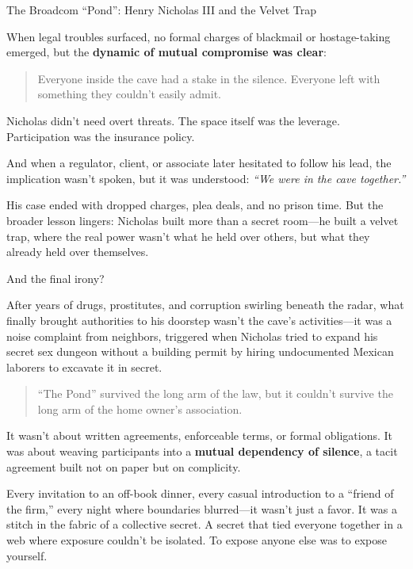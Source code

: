 \begin{HistoricalSidebar}{The Broadcom ``Pond'': Henry Nicholas III and the Velvet Trap}
  \medskip
  
  When legal troubles surfaced, no formal charges of blackmail or hostage-taking emerged, but the \textbf{dynamic of mutual compromise was clear}:  

  \begin{quote}
  Everyone inside the cave had a stake in the silence.  Everyone left with something they couldn’t easily admit.  
  \end{quote}
  
  Nicholas didn’t need overt threats. The space itself was the leverage. Participation was the insurance policy.  

  \medskip
  
  And when a regulator, client, or associate later hesitated to follow his lead, the implication wasn’t spoken, but it was understood:  \textit{“We were in the cave together.”}

  \medskip
  
  His case ended with dropped charges, plea deals, and no prison time. But the broader lesson lingers: Nicholas built more than a secret room—he built a velvet trap, where the real power wasn’t what he held over others, but what they already held over themselves.

  \medskip

  And the final irony?
  
  \medskip

  After years of drugs, prostitutes, and corruption swirling beneath the radar, what finally brought authorities to his doorstep wasn’t the cave’s activities—it was a noise complaint from neighbors, triggered when Nicholas tried to expand his secret sex dungeon without a building permit by hiring undocumented Mexican laborers to excavate it in secret.

  \begin{quote}
  ``The Pond'' survived the long arm of the law, but it couldn’t survive the long arm of the home owner's association.
  \end{quote}

\end{HistoricalSidebar}

\medskip


It wasn’t about written agreements, enforceable terms, or formal obligations. It was about weaving participants into a \textbf{mutual dependency of silence}, a tacit agreement built not on paper but on complicity.

Every invitation to an off-book dinner, every casual introduction to a “friend of the firm,” every night where boundaries blurred—it wasn’t just a favor. It was a stitch in the fabric of a collective secret. A secret that tied everyone together in a web where exposure couldn’t be isolated. To expose anyone else was to expose yourself.

